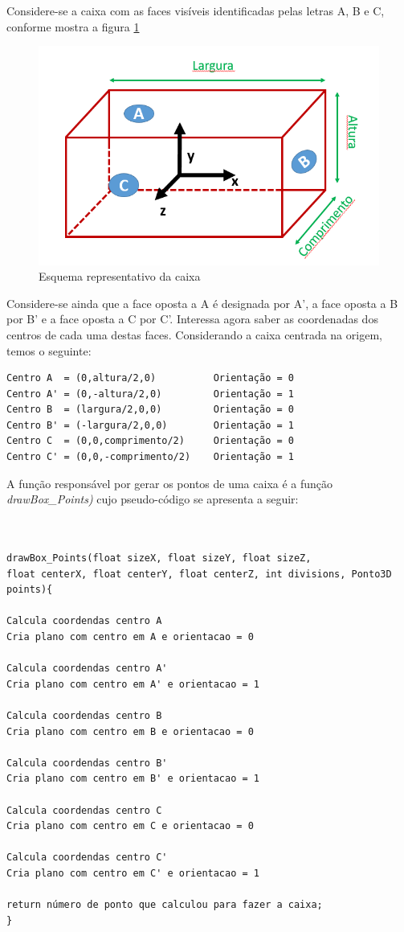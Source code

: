 Considere-se a caixa com as faces visíveis identificadas pelas letras A, B e C, conforme mostra a figura \ref{p1:fig:p3_Caixa}

\begin{figure}[<+htpb+>]
	\centering
	\includegraphics[scale=0.5]{imagens/p3_Caixa.png}
	\caption{Esquema representativo da caixa}
	\label{p1:fig:p3_Caixa}
\end{figure}

Considere-se ainda que a face oposta a A é designada por A', a face oposta a B por B' e a face oposta a C por C'.
Interessa agora saber as coordenadas dos centros de cada uma destas faces. Considerando a caixa centrada na origem, temos o seguinte:

\begin{Verbatim}
Centro A  = (0,altura/2,0)          Orientação = 0
Centro A' = (0,-altura/2,0)         Orientação = 1
Centro B  = (largura/2,0,0)         Orientação = 0
Centro B' = (-largura/2,0,0)        Orientação = 1
Centro C  = (0,0,comprimento/2)     Orientação = 0
Centro C' = (0,0,-comprimento/2)    Orientação = 1
\end{Verbatim}



A função responsável por gerar os pontos de uma caixa é a função \textit{drawBox\_Points)} cujo pseudo-código se apresenta a seguir:

\begin{Verbatim}


drawBox_Points(float sizeX, float sizeY, float sizeZ, 
float centerX, float centerY, float centerZ, int divisions, Ponto3D points){

Calcula coordendas centro A
Cria plano com centro em A e orientacao = 0

Calcula coordendas centro A'
Cria plano com centro em A' e orientacao = 1

Calcula coordendas centro B
Cria plano com centro em B e orientacao = 0

Calcula coordendas centro B'
Cria plano com centro em B' e orientacao = 1

Calcula coordendas centro C
Cria plano com centro em C e orientacao = 0

Calcula coordendas centro C'
Cria plano com centro em C' e orientacao = 1

return número de ponto que calculou para fazer a caixa;
}

\end{Verbatim}


